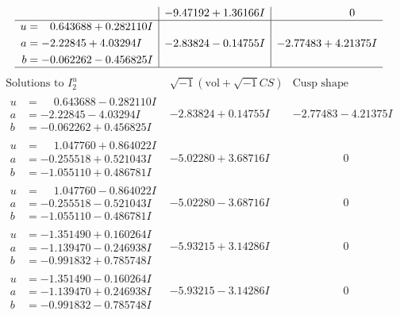 \documentclass[1p]{elsarticle_modified}
\theoremstyle{definition}
\newcommand{\I}{\sqrt{-1}}
\begin{document}
$$\begin{array}{c|c|c}
 & -9.47192 + 1.36166 I & \phantom{-0.000000 } 0 \\ \hline\begin{aligned}
u &= \phantom{-}0.643688 + 0.282110 I \\
a &= -2.22845 + 4.03294 I \\
b &= -0.062262 - 0.456825 I\end{aligned}
 & -2.83824 - 0.14755 I & -2.77483 + 4.21375 I\\
 \hline 
 \end{array}$$\newpage$$\begin{array}{c|c|c}  
\text{Solutions to }I^u_{2}& \I (\text{vol} + \sqrt{-1}CS) & \text{Cusp shape}\\
 \hline 
\begin{aligned}
u &= \phantom{-}0.643688 - 0.282110 I \\
a &= -2.22845 - 4.03294 I \\
b &= -0.062262 + 0.456825 I\end{aligned}
 & -2.83824 + 0.14755 I & -2.77483 - 4.21375 I \\ \hline\begin{aligned}
u &= \phantom{-}1.047760 + 0.864022 I \\
a &= -0.255518 + 0.521043 I \\
b &= -1.055110 + 0.486781 I\end{aligned}
 & -5.02280 + 3.68716 I & \phantom{-0.000000 } 0 \\ \hline\begin{aligned}
u &= \phantom{-}1.047760 - 0.864022 I \\
a &= -0.255518 - 0.521043 I \\
b &= -1.055110 - 0.486781 I\end{aligned}
 & -5.02280 - 3.68716 I & \phantom{-0.000000 } 0 \\ \hline\begin{aligned}
u &= -1.351490 + 0.160264 I \\
a &= -1.139470 - 0.246938 I \\
b &= -0.991832 + 0.785748 I\end{aligned}
 & -5.93215 + 3.14286 I & \phantom{-0.000000 } 0 \\ \hline\begin{aligned}
u &= -1.351490 - 0.160264 I \\
a &= -1.139470 + 0.246938 I \\
b &= -0.991832 - 0.785748 I\end{aligned}
 & -5.93215 - 3.14286 I & \phantom{-0.000000 } 0 \\ \hline\begin{aligned}

\end{aligned}
\end{array}$$
\end{document}
